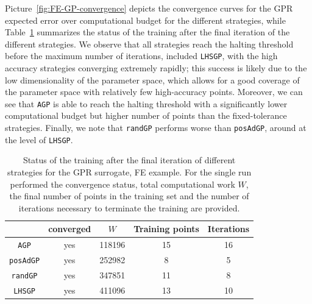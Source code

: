 Picture~\ref{fig:FE-GP-convergence} depicts the convergence curves for the GPR expected error over computational budget for the different strategies, while Table~\ref{tab:FE-GP-recap} summarizes the status of the training after the final iteration of the different strategies.
We observe that all strategies reach the halting threshold before the maximum number of iterations, included \texttt{LHSGP}, with the high accuracy strategies converging extremely rapidly; this success is likely due to the low dimensionality of the parameter space, which allows for a good coverage of the parameter space with relatively few high-accuracy points.
Moreover, we can see that \texttt{AGP} is able to reach the halting threshold with a significantly lower computational budget but higher number of points than the fixed-tolerance strategies.
Finally, we note that \texttt{randGP} performs worse than \texttt{posAdGP}, around at the level of \texttt{LHSGP}.
\begin{table}[H]
    \begin{centering}
    \begin{tabular}{ccccc}
    \toprule
        & converged   & $W$ & Training points    & Iterations \\ 
        \midrule
        \texttt{AGP}  
        & yes & 118196 &  15   &  16  \\
        \texttt{posAdGP}
        & yes & 252982 &  8   &  5  \\
        \texttt{randGP}
        & yes & 347851 &  11   &  8  \\
        \texttt{LHSGP}
        & yes & 411096 &  13   &  10  \\
    \bottomrule
    \end{tabular}
    \caption{Status of the training after the final iteration of different strategies for the GPR surrogate, FE example. For the single run performed the convergence status, total computational work $W$, the final number of points in the training set and the number of iterations necessary to terminate the training are provided.
    }
    \label{tab:FE-GP-recap}
\end{centering}
\end{table} 

